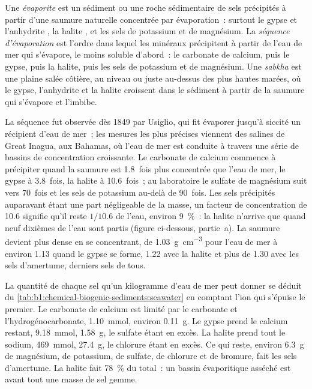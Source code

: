 \begin{definition}\label{def:b1:chemical-biogenic-sediments:evaporite}
Une \emph{évaporite} est un sédiment ou une roche sédimentaire de sels
précipités à partir d'une saumure naturelle concentrée par évaporation~: surtout le gypse
 et l'anhydrite , la halite , et les sels de potassium et de
magnésium. La \emph{séquence d'évaporation} est
l'ordre dans lequel les minéraux précipitent à partir de l'eau de mer qui s'évapore, le moins
soluble d'abord~: le carbonate de calcium, puis le gypse, puis la halite, puis les sels de potassium
et de magnésium. Une \emph{sabkha} est une plaine salée côtière, au niveau ou
juste au-dessus des plus hautes marées, où le gypse, l'anhydrite et la halite
croissent dans le sédiment à partir de la saumure qui s'évapore et l'imbibe.
\end{definition}

La séquence fut observée dès 1849 par Usiglio, qui fit évaporer jusqu'à siccité un récipient
d'eau de mer~; les mesures les plus précises viennent des
salines de Great Inagua, aux Bahamas, où l'eau de mer est conduite à travers une série de
bassins de concentration croissante. Le carbonate de calcium commence à précipiter quand
la saumure est 1.8~fois plus concentrée que l'eau de mer, le gypse à 3.8~fois, la halite
à 10.6~fois~; au laboratoire le sulfate de magnésium suit vers 70~fois
et les sels de potassium au-delà de 90~fois. Les sels précipités auparavant étant une part
négligeable de la masse, un facteur de concentration de 10.6 signifie qu'il reste
$1/10.6$ de l'eau, environ \qty{9}{\%}~: la halite n'arrive que quand neuf dixièmes
de l'eau sont partis (figure ci-dessous, partie~a).
La saumure devient plus dense en se concentrant, de \qty{1.03}{g.cm^{-3}} pour
l'eau de mer à environ \num{1.13} quand le gypse se forme, \num{1.22} avec la halite et plus
de \num{1.30} avec les sels d'amertume, derniers sels de tous.

La quantité de chaque sel qu'un kilogramme d'eau de mer peut donner se déduit du
\cref{tab:b1:chemical-biogenic-sediments:seawater} en comptant l'ion qui s'épuise
le premier. Le carbonate de calcium est limité par le carbonate et l'hydrogénocarbonate,
\qty{1.10}{mmol}, environ \qty{0.11}{g}. Le gypse prend le calcium restant,
\qty{9.18}{mmol}, \qty{1.58}{g}, le sulfate étant en excès. La halite prend tout le
sodium, \qty{469}{mmol}, \qty{27.4}{g}, le chlorure étant en excès. Ce qui reste,
environ \qty{6.3}{g} de magnésium, de potassium, de sulfate, de chlorure et de bromure, fait
les sels d'amertume. La halite fait \qty{78}{\%} du total~: un bassin évaporitique
asséché est avant tout une masse de sel gemme.

